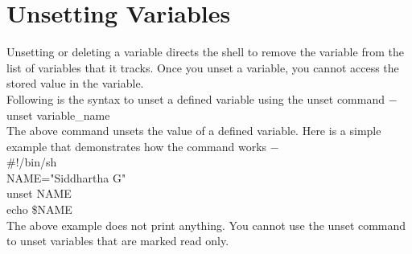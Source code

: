 \documentclass{article}
\begin{document}
\section*{Unsetting Variables}
Unsetting or deleting a variable directs the shell to remove the variable from the list of variables that it tracks. Once you unset a variable, you cannot access the stored value in the variable.\\
Following is the syntax to unset a defined variable using the unset command −\\
unset variable\_name\\
The above command unsets the value of a defined variable. Here is a simple example that demonstrates how the command works −\\
\#!/bin/sh\\
NAME="Siddhartha G"\\
unset NAME\\
echo \$NAME\\
The above example does not print anything. You cannot use the unset command to unset variables that are marked read only.\\

\end{document}
